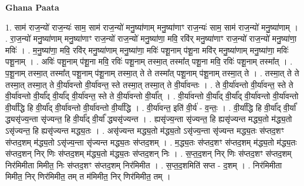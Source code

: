 \documentclass[17pt]{extarticle}
\begin{document}
\textbf{Ghana Paata } \newline

1. साम॑ राज॒न्यो॑ राज॒न्यः॑ साम॒ साम॑ राज॒न्यो॑ मनु॒ष्या॑णाम् मनु॒ष्या॑णाꣳ राज॒न्यः॑ साम॒ साम॑ राज॒न्यो॑ मनु॒ष्या॑णाम् । . रा॒ज॒न्यो॑ मनु॒ष्या॑णाम् मनु॒ष्या॑णाꣳ राज॒न्यो॑ राज॒न्यो॑ मनु॒ष्या॑णा॒ मवि॒ रवि॑र् मनु॒ष्या॑णाꣳ राज॒न्यो॑ राज॒न्यो॑ मनु॒ष्या॑णा॒ मविः॑ । . म॒नु॒ष्या॑णा॒ मवि॒ रवि॑र् मनु॒ष्या॑णाम् मनु॒ष्या॑णा॒ मविः॑ पशू॒नाम् प॑शू॒ना मवि॑र् मनु॒ष्या॑णाम् मनु॒ष्या॑णा॒ मविः॑ पशू॒नाम् । . अविः॑ पशू॒नाम् प॑शू॒ना मवि॒ रविः॑ पशू॒नाम् तस्मा॒त् तस्मा᳚त् पशू॒ना मवि॒ रविः॑ पशू॒नाम् तस्मा᳚त् । . प॒शू॒नाम् तस्मा॒त् तस्मा᳚त् पशू॒नाम् प॑शू॒नाम् तस्मा॒त् ते ते तस्मा᳚त् पशू॒नाम् प॑शू॒नाम् तस्मा॒त् ते । . तस्मा॒त् ते ते तस्मा॒त् तस्मा॒त् ते वी॒र्या॑वन्तो वी॒र्या॑वन्त॒ स्ते तस्मा॒त् तस्मा॒त् ते वी॒र्या॑वन्तः । . ते वी॒र्या॑वन्तो वी॒र्या॑वन्त॒ स्ते ते वी॒र्या॑वन्तो वी॒र्या᳚द् वी॒र्या᳚द् वी॒र्या॑वन्त॒ स्ते ते वी॒र्या॑वन्तो वी॒र्या᳚त् । . वी॒र्या॑वन्तो वी॒र्या᳚द् वी॒र्या᳚द् वी॒र्या॑वन्तो वी॒र्या॑वन्तो वी॒र्या᳚द्धि हि वी॒र्या᳚द् वी॒र्या॑वन्तो वी॒र्या॑वन्तो वी॒र्या᳚द्धि । . वी॒र्या॑वन्त॒ इति॑ वी॒र्य॑ - व॒न्तः॒ । . वी॒र्या᳚द्धि हि वी॒र्या᳚द् वी॒र्या᳚ द्ध्यसृ॑ज्य॒न्ता सृ॑ज्यन्त॒ हि वी॒र्या᳚द् वी॒र्या᳚ द्ध्यसृ॑ज्यन्त । . ह्यसृ॑ज्य॒न्ता सृ॑ज्यन्त॒ हि ह्यसृ॑ज्यन्त मद्ध्य॒तो म॑द्ध्य॒तो ऽसृ॑ज्यन्त॒ हि ह्यसृ॑ज्यन्त मद्ध्य॒तः । . असृ॑ज्यन्त मद्ध्य॒तो म॑द्ध्य॒तो ऽसृ॑ज्य॒न्ता सृ॑ज्यन्त मद्ध्य॒तः स॑प्तद॒शꣳ स॑प्तद॒शम् म॑द्ध्य॒तो ऽसृ॑ज्य॒न्ता सृ॑ज्यन्त मद्ध्य॒तः स॑प्तद॒शम् । . म॒द्ध्य॒तः स॑प्तद॒शꣳ स॑प्तद॒शम् म॑द्ध्य॒तो म॑द्ध्य॒तः स॑प्तद॒शन् निर् णिः स॑प्तद॒शम् म॑द्ध्य॒तो म॑द्ध्य॒तः स॑प्तद॒शन् निः । . स॒प्त॒द॒शन् निर् णिः स॑प्तद॒शꣳ स॑प्तद॒शम् निर॑मिमीता मिमीत॒ निः स॑प्तद॒शꣳ स॑प्तद॒शम् निर॑मिमीत । . स॒प्त॒द॒शमिति॑ सप्त - द॒शम् । . निर॑मिमीता मिमीत॒ निर् णिर॑मिमीत॒ तम् त म॑मिमीत॒ निर् णिर॑मिमीत॒ तम् । \newline
\end{document}

